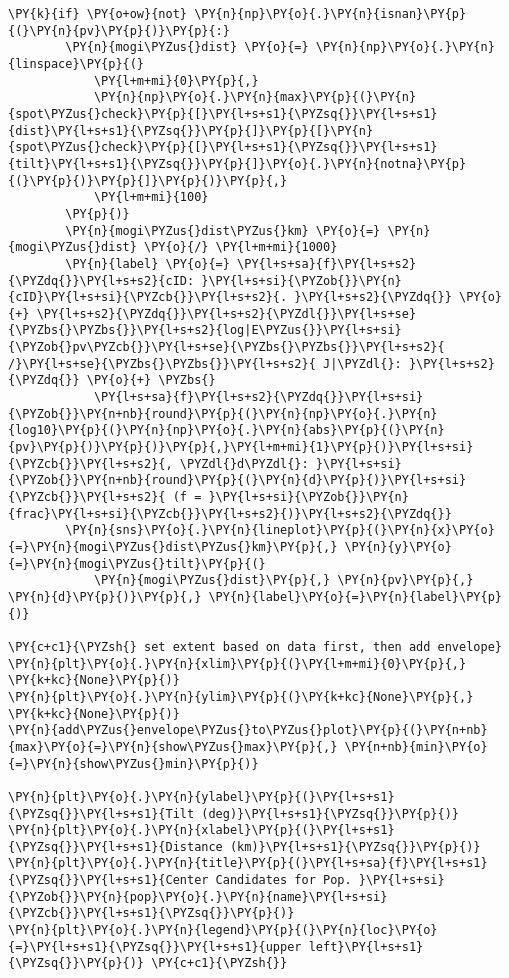 \begin{tcolorbox}[breakable, size=fbox, boxrule=1pt, pad at break*=1mm,colback=cellbackground, colframe=cellborder]
\begin{Verbatim}[commandchars=\\\{\}]
    \PY{k}{if} \PY{o+ow}{not} \PY{n}{np}\PY{o}{.}\PY{n}{isnan}\PY{p}{(}\PY{n}{pv}\PY{p}{)}\PY{p}{:}
        \PY{n}{mogi\PYZus{}dist} \PY{o}{=} \PY{n}{np}\PY{o}{.}\PY{n}{linspace}\PY{p}{(}
            \PY{l+m+mi}{0}\PY{p}{,}
            \PY{n}{np}\PY{o}{.}\PY{n}{max}\PY{p}{(}\PY{n}{spot\PYZus{}check}\PY{p}{[}\PY{l+s+s1}{\PYZsq{}}\PY{l+s+s1}{dist}\PY{l+s+s1}{\PYZsq{}}\PY{p}{]}\PY{p}{[}\PY{n}{spot\PYZus{}check}\PY{p}{[}\PY{l+s+s1}{\PYZsq{}}\PY{l+s+s1}{tilt}\PY{l+s+s1}{\PYZsq{}}\PY{p}{]}\PY{o}{.}\PY{n}{notna}\PY{p}{(}\PY{p}{)}\PY{p}{]}\PY{p}{)}\PY{p}{,}
            \PY{l+m+mi}{100}
        \PY{p}{)}
        \PY{n}{mogi\PYZus{}dist\PYZus{}km} \PY{o}{=} \PY{n}{mogi\PYZus{}dist} \PY{o}{/} \PY{l+m+mi}{1000}
        \PY{n}{label} \PY{o}{=} \PY{l+s+sa}{f}\PY{l+s+s2}{\PYZdq{}}\PY{l+s+s2}{cID: }\PY{l+s+si}{\PYZob{}}\PY{n}{cID}\PY{l+s+si}{\PYZcb{}}\PY{l+s+s2}{. }\PY{l+s+s2}{\PYZdq{}} \PY{o}{+} \PY{l+s+s2}{\PYZdq{}}\PY{l+s+s2}{\PYZdl{}}\PY{l+s+se}{\PYZbs{}\PYZbs{}}\PY{l+s+s2}{log|E\PYZus{}}\PY{l+s+si}{\PYZob{}pv\PYZcb{}}\PY{l+s+se}{\PYZbs{}\PYZbs{}}\PY{l+s+s2}{ /}\PY{l+s+se}{\PYZbs{}\PYZbs{}}\PY{l+s+s2}{ J|\PYZdl{}: }\PY{l+s+s2}{\PYZdq{}} \PY{o}{+} \PYZbs{}
            \PY{l+s+sa}{f}\PY{l+s+s2}{\PYZdq{}}\PY{l+s+si}{\PYZob{}}\PY{n+nb}{round}\PY{p}{(}\PY{n}{np}\PY{o}{.}\PY{n}{log10}\PY{p}{(}\PY{n}{np}\PY{o}{.}\PY{n}{abs}\PY{p}{(}\PY{n}{pv}\PY{p}{)}\PY{p}{)}\PY{p}{,}\PY{l+m+mi}{1}\PY{p}{)}\PY{l+s+si}{\PYZcb{}}\PY{l+s+s2}{, \PYZdl{}d\PYZdl{}: }\PY{l+s+si}{\PYZob{}}\PY{n+nb}{round}\PY{p}{(}\PY{n}{d}\PY{p}{)}\PY{l+s+si}{\PYZcb{}}\PY{l+s+s2}{ (f = }\PY{l+s+si}{\PYZob{}}\PY{n}{frac}\PY{l+s+si}{\PYZcb{}}\PY{l+s+s2}{)}\PY{l+s+s2}{\PYZdq{}}
        \PY{n}{sns}\PY{o}{.}\PY{n}{lineplot}\PY{p}{(}\PY{n}{x}\PY{o}{=}\PY{n}{mogi\PYZus{}dist\PYZus{}km}\PY{p}{,} \PY{n}{y}\PY{o}{=}\PY{n}{mogi\PYZus{}tilt}\PY{p}{(}
            \PY{n}{mogi\PYZus{}dist}\PY{p}{,} \PY{n}{pv}\PY{p}{,} \PY{n}{d}\PY{p}{)}\PY{p}{,} \PY{n}{label}\PY{o}{=}\PY{n}{label}\PY{p}{)}

\PY{c+c1}{\PYZsh{} set extent based on data first, then add envelope}
\PY{n}{plt}\PY{o}{.}\PY{n}{xlim}\PY{p}{(}\PY{l+m+mi}{0}\PY{p}{,} \PY{k+kc}{None}\PY{p}{)}
\PY{n}{plt}\PY{o}{.}\PY{n}{ylim}\PY{p}{(}\PY{k+kc}{None}\PY{p}{,} \PY{k+kc}{None}\PY{p}{)}
\PY{n}{add\PYZus{}envelope\PYZus{}to\PYZus{}plot}\PY{p}{(}\PY{n+nb}{max}\PY{o}{=}\PY{n}{show\PYZus{}max}\PY{p}{,} \PY{n+nb}{min}\PY{o}{=}\PY{n}{show\PYZus{}min}\PY{p}{)}

\PY{n}{plt}\PY{o}{.}\PY{n}{ylabel}\PY{p}{(}\PY{l+s+s1}{\PYZsq{}}\PY{l+s+s1}{Tilt (deg)}\PY{l+s+s1}{\PYZsq{}}\PY{p}{)}
\PY{n}{plt}\PY{o}{.}\PY{n}{xlabel}\PY{p}{(}\PY{l+s+s1}{\PYZsq{}}\PY{l+s+s1}{Distance (km)}\PY{l+s+s1}{\PYZsq{}}\PY{p}{)}
\PY{n}{plt}\PY{o}{.}\PY{n}{title}\PY{p}{(}\PY{l+s+sa}{f}\PY{l+s+s1}{\PYZsq{}}\PY{l+s+s1}{Center Candidates for Pop. }\PY{l+s+si}{\PYZob{}}\PY{n}{pop}\PY{o}{.}\PY{n}{name}\PY{l+s+si}{\PYZcb{}}\PY{l+s+s1}{\PYZsq{}}\PY{p}{)}
\PY{n}{plt}\PY{o}{.}\PY{n}{legend}\PY{p}{(}\PY{n}{loc}\PY{o}{=}\PY{l+s+s1}{\PYZsq{}}\PY{l+s+s1}{upper left}\PY{l+s+s1}{\PYZsq{}}\PY{p}{)} \PY{c+c1}{\PYZsh{}}


\end{Verbatim}
\end{tcolorbox}
